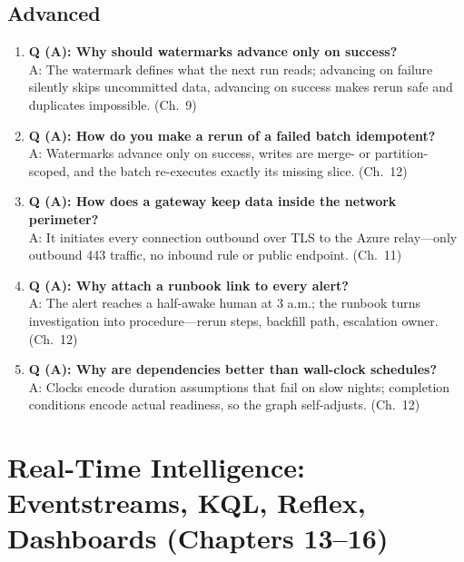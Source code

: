 \subsection*{Advanced}
\begin{enumerate}
    \item \textbf{Q (A): Why should watermarks advance only on success?}\\
    A: The watermark defines what the next run reads; advancing on failure silently skips
    uncommitted data, advancing on success makes rerun safe and duplicates impossible. (Ch.~9)
    \item \textbf{Q (A): How do you make a rerun of a failed batch idempotent?}\\
    A: Watermarks advance only on success, writes are merge- or partition-scoped, and the batch
    re-executes exactly its missing slice. (Ch.~12)
    \item \textbf{Q (A): How does a gateway keep data inside the network perimeter?}\\
    A: It initiates every connection outbound over TLS to the Azure relay---only outbound 443
    traffic, no inbound rule or public endpoint. (Ch.~11)
    \item \textbf{Q (A): Why attach a runbook link to every alert?}\\
    A: The alert reaches a half-awake human at 3 a.m.; the runbook turns investigation into
    procedure---rerun steps, backfill path, escalation owner. (Ch.~12)
    \item \textbf{Q (A): Why are dependencies better than wall-clock schedules?}\\
    A: Clocks encode duration assumptions that fail on slow nights; completion conditions
    encode actual readiness, so the graph self-adjusts. (Ch.~12)
\end{enumerate}

\section{Real-Time Intelligence: Eventstreams, KQL, Reflex, Dashboards (Chapters 13--16)}

